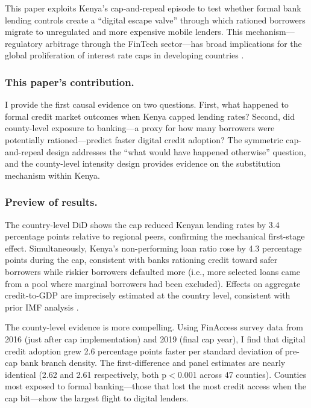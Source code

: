 \documentclass[12pt]{article}
\begin{document}
This paper exploits Kenya's cap-and-repeal episode to test whether formal bank lending controls create a ``digital escape valve'' through which rationed borrowers migrate to unregulated and more expensive mobile lenders. This mechanism---regulatory arbitrage through the FinTech sector---has broad implications for the global proliferation of interest rate caps in developing countries \citep{world_bank_2020_rate_caps}.

\subsubsection*{This paper's contribution.}
I provide the first causal evidence on two questions. First, what happened to formal credit market outcomes when Kenya capped lending rates? Second, did county-level exposure to banking---a proxy for how many borrowers were potentially rationed---predict faster digital credit adoption? The symmetric cap-and-repeal design addresses the ``what would have happened otherwise'' question, and the county-level intensity design provides evidence on the substitution mechanism within Kenya.

\subsubsection*{Preview of results.}
The country-level DiD shows the cap reduced Kenyan lending rates by 3.4 percentage points relative to regional peers, confirming the mechanical first-stage effect. Simultaneously, Kenya's non-performing loan ratio rose by 4.3 percentage points during the cap, consistent with banks rationing credit toward safer borrowers while riskier borrowers defaulted more (i.e., more selected loans came from a pool where marginal borrowers had been excluded). Effects on aggregate credit-to-GDP are imprecisely estimated at the country level, consistent with prior IMF analysis \citep{alper2019}.

The county-level evidence is more compelling. Using FinAccess survey data from 2016 (just after cap implementation) and 2019 (final cap year), I find that digital credit adoption grew 2.6 percentage points faster per standard deviation of pre-cap bank branch density. The first-difference and panel estimates are nearly identical (2.62 and 2.61 respectively, both p$<$0.001 across 47 counties). Counties most exposed to formal banking---those that lost the most credit access when the cap bit---show the largest flight to digital lenders.
\end{document}
